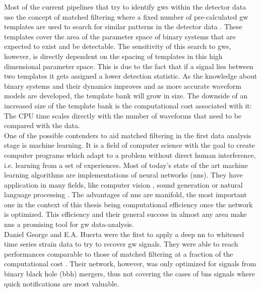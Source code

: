 Most of the current pipelines that try to identify \gls{gw}s within the detector data use the concept of matched filtering where a fixed number of pre-calculated \gls{gw} templates are used to search for similar patterns in the detector data \cite{ligo_pipelines}. These templates cover the area of the parameter space of binary systems that are expected to exist and be detectable. The sensitivity of this search to \gls{gw}s, however, is directly dependent on the spacing of templates in this high dimensional parameter space. This is due to the fact that if a signal lies between two templates it gets assigned a lower detection statistic. As the knowledge about binary systems and their dynamics improves and as more accurate waveform models are developed, the template bank will grow in size. The downside of an increased size of the template bank is the computational cost associated with it: The CPU time scales directly with the number of waveforms that need to be compared with the data.\\%
One of the possible contenders to aid matched filtering in the first data analysis stage is machine learning. It is a field of computer science with the goal to create computer programs which adapt to a problem without direct human interference, i.e. learning from a set of experiences. Most of today's state of the art machine learning algorithms are implementations of neural networks (\gls{nn}s). They have application in many fields, like computer vision \cite{ILSVRC15}, sound generation \cite{wavenet} or natural language processing \cite{natural_language_processing}. The advantages of \gls{nn}s are manifold, the most important one in the context of this thesis being computational efficiency once the network is optimized. This efficiency and their general success in almost any area make \gls{nn}s a promising tool for \gls{gw} data-analysis.\\
Daniel George and E.A. Huerta were the first to apply a deep \gls{nn} to whitened time series strain data to try to recover \gls{gw} signals. They were able to reach performances comparable to those of matched filtering at a fraction of the computational cost \cite{original_deep_filtering}. Their network, however, was only optimized for signals from binary black hole (\gls{bbh}) mergers, thus not covering the cases of \gls{bns} signals where quick notifications are most valuable.\\
